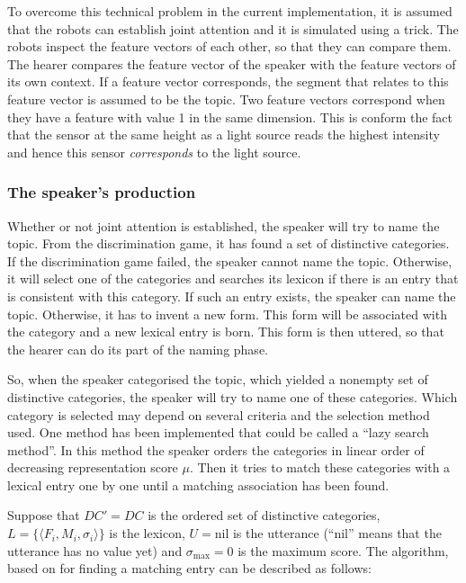 To overcome this technical problem in the current implementation, it is assumed that the robots can establish joint attention and it is simulated using a trick. The robots inspect the feature vectors of each other, so that they can compare them. The hearer compares the feature vector of the speaker with the feature vectors of its own context. If a feature vector corresponds, the segment that relates to this feature vector is assumed to be the topic. Two feature vectors correspond when they have a feature with value 1 in the same dimension. This is conform the fact that the sensor at the same height as a light source reads the highest intensity and hence this sensor {\em corresponds} to the light source.

\subsubsection{The speaker's production}\label{s:cm:production}

Whether or not joint attention is established, the speaker will try to name the topic. From the discrimination game, it has found a set of distinctive categories. If the discrimination game failed, the speaker cannot name the topic. Otherwise, it will select one of the categories and searches its lexicon if there is an entry that is consistent with this category. If such an entry exists, the speaker can name the topic. Otherwise, it has to invent a new form. This form will be associated with the category and a new lexical entry is born. This form is then uttered, so that the hearer can do its part of the naming phase. 

So, when the speaker categorised the topic, which yielded a nonempty set of distinctive categories, the speaker will try to name one of these categories. Which category is selected may depend on several criteria and the selection method used. One method has been implemented that could be called a ``lazy search method''. In this method the speaker orders the categories in linear order of decreasing representation score $\mu$. Then it tries to match these categories with a lexical entry one by one until a matching association has been found.

Suppose that $DC'=DC$ is the ordered set of distinctive categories, $L=\{\langle F_i,M_i,\sigma_i \rangle \}$ is the lexicon, $U=\mbox{nil}$ is the utterance (``nil'' means that the utterance has no value yet) and $\sigma_{\mbox{max}}=0$ is the maximum score. The algorithm, based on \citet{steels:1996a} for finding a matching entry can be described as follows:

